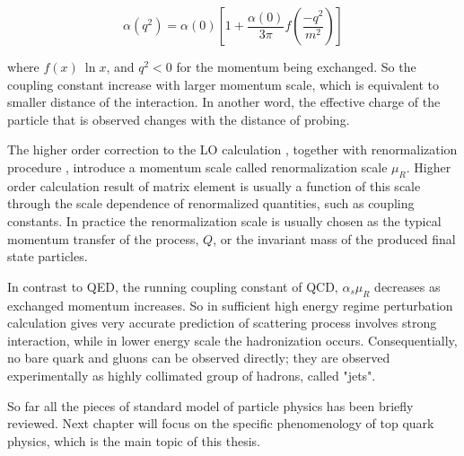 \begin{equation}
\alpha(q^2) = \alpha(0) \left[ 1+\frac{\alpha(0)}{3\pi} f( \frac{-q^2}{m^2} ) \right]
\label{eq:running-alpha}
\end{equation}

where $f(x)~\ln x$, and $q^2<0$ for the momentum being exchanged. So the coupling constant increase with larger momentum scale, which is equivalent to smaller distance of the interaction. In another word, the effective charge of the particle that is observed changes with the distance of probing. 

The higher order correction to the LO calculation , together with renormalization procedure , introduce a momentum scale called renormalization scale $\mu_R$. Higher order calculation result of matrix element is usually a function of this scale through the scale dependence of renormalized quantities, such as coupling constants. In practice the renormalization scale is usually chosen as the typical momentum transfer of the process, $Q$, or the invariant mass of the produced final state particles.

In contrast to QED, the running coupling constant of QCD, $\alpha_s{\mu_R}$ decreases as exchanged momentum increases. So in sufficient high energy regime perturbation calculation gives very accurate prediction of scattering process involves strong interaction, while in lower energy scale the hadronization occurs. Consequentially, no bare quark and gluons can be observed directly; they are observed experimentally as highly collimated group of hadrons, called "jets".

So far all the pieces of standard model of particle physics has been briefly reviewed. Next chapter will focus on the specific phenomenology of top quark physics, which is the main topic of this thesis.


 